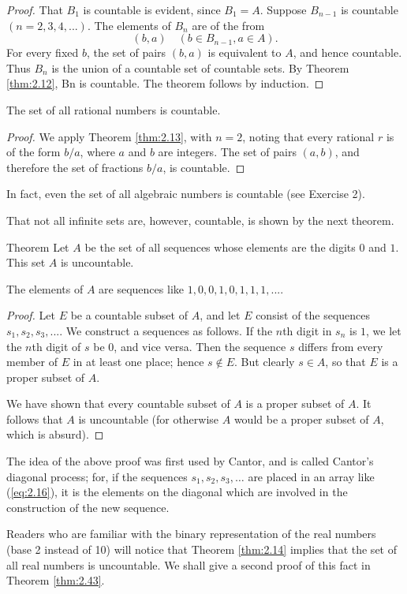 \begin{proof}
    That $B_1$ is countable is evident, since $B_1 = A$. 
    Suppose $B_{n-1}$ is countable $(n = 2, 3, 4, ... )$. 
    The elements of $B_n$ are of the from
    \begin{equation}
        \label{eq:2.18}
        (b,a)
        \quad
        (b \in B_{n-1},a \in A).
    \end{equation}
    For every fixed $b$, the set of pairs $(b, a)$ is equivalent to $A$, and hence countable. 
    Thus $B_n$ is the union of a countable set of countable sets. 
    By Theorem \ref{thm:2.12}, Bn is countable.
The theorem follows by induction.
\end{proof}

\begin{myCorollary*}
    The set of all rational numbers is countable.
\end{myCorollary*}

\begin{proof}
    We apply Theorem \ref{thm:2.13}, 
    with $n = 2$, noting that every rational $r$ is of the form $b / a$, 
    where $a$ and $b$ are integers. 
    The set of pairs $(a, b)$, 
    and therefore the set of fractions $b / a$, is countable.
\end{proof}

In fact, even the set of all algebraic numbers is countable (see Exercise 2).

That not all infinite sets are, however, countable, is shown by the next
theorem.

\begin{thm}\label{thm:2.14}
    Theorem Let $A$ be the set of all sequences whose elements are the digits $0$ and $1$. This set $A$ is uncountable. 
\end{thm}

The elements of $A$ are sequences like $1, 0, 0, 1, 0, 1, 1, 1, ... .$

\begin{proof}
    Let $E$ be a countable subset of $A$, 
    and let $E$ consist of the sequences $s_1, s_2 , s_3 , ...$. 
    We construct a sequences as follows. 
    If the $n$th digit in $s_n$ is $1$, 
    we let the $n$th digit of $s$ be $0$, and vice versa. 
    Then the sequence $s$ differs from every member of $E$ in at least one place; hence $s \not\in E$. 
    But clearly $s \in A$, so that $E$ is a proper subset of $A$.

    We have shown that 
    every countable subset of $A$ is a proper subset of $A$. 
    It follows that $A$ is uncountable 
    (for otherwise $A$ would be a proper subset of $A$, which is absurd).
\end{proof}

The idea of the above proof was first used by Cantor, 
and is called Cantor's diagonal process; 
for, if the sequences $s_1, s_2 , s_3 ,\dots$ are placed in an array like (\ref{eq:2.16}), 
it is the elements on the diagonal which are involved in the construction of the new sequence.

Readers who are familiar with the binary representation of the real numbers (base 2 instead of 10) will notice that 
Theorem \ref{thm:2.14} implies that the set of all real numbers is uncountable. 
We shall give a second proof of this fact in Theorem \ref{thm:2.43}.